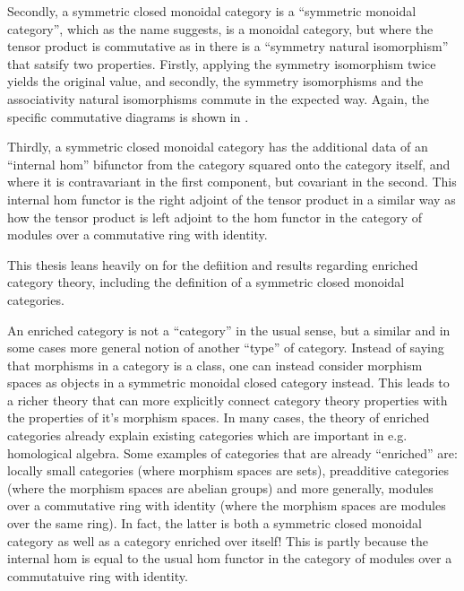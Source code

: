 Secondly, a symmetric closed monoidal category is a ``symmetric monoidal category'', which as the name suggests, is a monoidal category, but where the tensor product is commutative as in there is a ``symmetry natural isomorphism'' that satsify two properties. Firstly, applying the symmetry isomorphism twice yields the original value, and secondly, the symmetry isomorphisms and the associativity natural isomorphisms commute in the expected way. Again, the specific commutative diagrams is shown in \cite[Diagram 6.3, Diagram 6.4, Diagram 6.5]{Borceux_1994}.

Thirdly, a symmetric closed monoidal category has the additional data of an ``internal hom'' bifunctor from the category squared onto the category itself, and where it is contravariant in the first component, but covariant in the second. This internal hom functor is the right adjoint of the tensor product in a similar way as how the tensor product is left adjoint to the hom functor in the category of modules over a commutative ring with identity.

This thesis leans heavily on \cite[Chapter 6]{Borceux_1994} for the defiition and results regarding enriched category theory, including the definition of a symmetric closed monoidal categories.

An enriched category is not a ``category'' in the usual sense, but a similar and in some cases more general notion of another ``type'' of category. Instead of saying that morphisms in a category is a class, one can instead consider morphism spaces as objects in a symmetric monoidal closed category instead. This leads to a richer theory that can more explicitly connect category theory properties with the properties of it's morphism spaces. In many cases, the theory of enriched categories already explain existing categories which are important in e.g. homological algebra. Some examples of categories that are already ``enriched'' are: locally small categories (where morphism spaces are sets), preadditive categories (where the morphism spaces are abelian groups) and more generally, modules over a commutative ring with identity (where the morphism spaces are modules over the same ring). In fact, the latter is both a symmetric closed monoidal category as well as a category enriched over itself! This is partly because the internal hom is equal to the usual hom functor in the category of modules over a commutatuive ring with identity.

